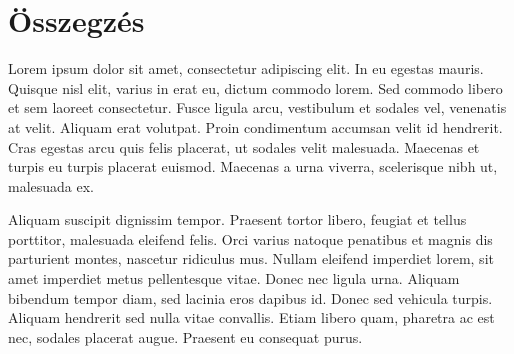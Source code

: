 \chapter{Összegzés} %
\label{ch:sum}

Lorem ipsum dolor sit amet, consectetur adipiscing elit. In eu egestas mauris. Quisque nisl elit, varius in erat eu, dictum commodo lorem. Sed commodo libero et sem laoreet consectetur. Fusce ligula arcu, vestibulum et sodales vel, venenatis at velit. Aliquam erat volutpat. Proin condimentum accumsan velit id hendrerit. Cras egestas arcu quis felis placerat, ut sodales velit malesuada. Maecenas et turpis eu turpis placerat euismod. Maecenas a urna viverra, scelerisque nibh ut, malesuada ex.

Aliquam suscipit dignissim tempor. Praesent tortor libero, feugiat et tellus porttitor, malesuada eleifend felis. Orci varius natoque penatibus et magnis dis parturient montes, nascetur ridiculus mus. Nullam eleifend imperdiet lorem, sit amet imperdiet metus pellentesque vitae. Donec nec ligula urna. Aliquam bibendum tempor diam, sed lacinia eros dapibus id. Donec sed vehicula turpis. Aliquam hendrerit sed nulla vitae convallis. Etiam libero quam, pharetra ac est nec, sodales placerat augue. Praesent eu consequat purus.


